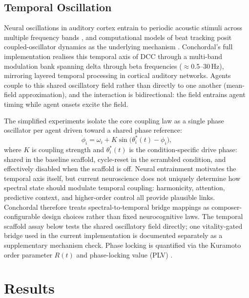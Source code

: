 \documentclass[letterpaper]{article}
\begin{document}
\subsection{Temporal Oscillation}

Neural oscillations in auditory cortex entrain to periodic acoustic stimuli across multiple frequency bands \citep{lakatos2008,doelling2015}, and computational models of beat tracking posit coupled-oscillator dynamics as the underlying mechanism \citep{large1999}. Conchordal's full implementation realises this temporal axis of DCC through a multi-band modulation bank spanning delta through beta frequencies ($\approx$0.5--30\,Hz), mirroring layered temporal processing in cortical auditory networks. Agents couple to this shared oscillatory field rather than directly to one another (mean-field approximation), and the interaction is bidirectional: the field entrains agent timing while agent onsets excite the field.

The simplified experiments isolate the core coupling law as a single phase oscillator per agent driven toward a shared phase reference:
%
\begin{equation}
\dot{\phi}_i = \omega_i + K\sin\!\bigl(\theta_i^{\ast}(t) - \phi_i\bigr),
\end{equation}
%
where $K$ is coupling strength and $\theta_i^{\ast}(t)$ is the condition-specific drive phase: shared in the baseline scaffold, cycle-reset in the scrambled condition, and effectively disabled when the scaffold is off. Neural entrainment motivates the temporal axis itself, but current neuroscience does not uniquely determine how spectral state should modulate temporal coupling: harmonicity, attention, predictive context, and higher-order control all provide plausible links. Conchordal therefore treats spectral-to-temporal bridge mappings as composer-configurable design choices rather than fixed neurocognitive laws. The temporal scaffold assay below tests the shared oscillatory field directly; one vitality-gated bridge used in the current implementation is documented separately as a supplementary mechanism check. Phase locking is quantified via the Kuramoto order parameter $R(t)$ \citep{kuramoto1984,strogatz2000} and phase-locking value (PLV) \citep{lachaux1999}.


\section{Results}
\end{document}
